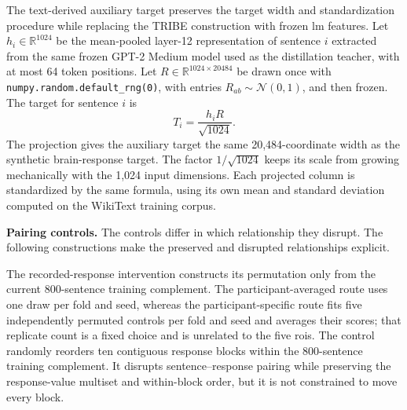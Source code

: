 The text-derived auxiliary target preserves the target width and standardization procedure while replacing the TRIBE construction with frozen \ac{lm} features.
Let $h_i\in\mathbb{R}^{1024}$ be the mean-pooled layer-12 representation of sentence $i$ extracted from the same frozen GPT-2 Medium model used as the distillation teacher, with at most 64 token positions.
Let $R\in\mathbb{R}^{1024\times 20484}$ be drawn once with \texttt{numpy.random.default\_rng(0)}, with entries $R_{ab}\sim\mathcal{N}(0,1)$, and then frozen.
The target for sentence $i$ is
\[
  T_i=\frac{h_iR}{\sqrt{1024}}.
\]
The projection gives the auxiliary target the same 20,484-coordinate width as the synthetic brain-response target.
The factor $1/\sqrt{1024}$ keeps its scale from growing mechanically with the 1,024 input dimensions.
Each projected column is standardized by the same formula, using its own mean and standard deviation computed on the WikiText training corpus. 

\noindent\textbf{Pairing controls.}
The controls differ in which relationship they disrupt.
The following constructions make the preserved and disrupted relationships explicit.

The recorded-response intervention constructs its permutation only from the current 800-sentence training complement.
The participant-averaged route uses one draw per fold and seed, whereas the participant-specific route fits five independently permuted controls per fold and seed and averages their scores; that replicate count is a fixed choice and is unrelated to the five \acp{roi}.
The control randomly reorders ten contiguous response blocks within the 800-sentence training complement.
It disrupts sentence--response pairing while preserving the response-value multiset and within-block order, but it is not constrained to move every block. 

